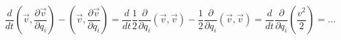 \documentclass{article}
\begin{document}
$$ \frac{d}{dt} \left(\overrightarrow{v}, \frac{\partial \overrightarrow{v}}{\partial q_i} \right) - \left( \overrightarrow{v}, \frac{\partial \overrightarrow{v}}{\partial q_i} \right) = \frac{d}{dt} \frac{1}{2} \frac{\partial}{\partial q_i} (\overrightarrow{v}, \overrightarrow{v}) - \frac{1}{2} \frac{\partial}{\partial q_i} (\overrightarrow{v}, \overrightarrow{v}) = \frac{d}{dt} \frac{\partial}{\partial q_i} \left(\frac{v^2}{2} \right) = \ldots $$
\end{document}
